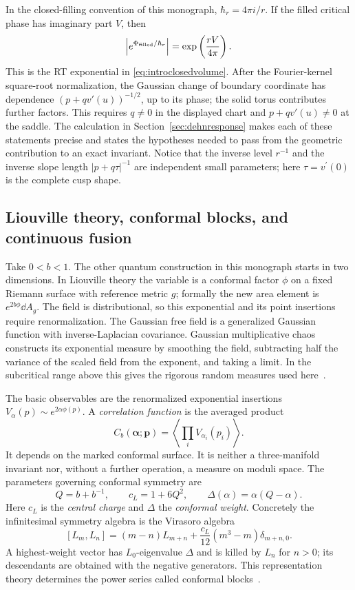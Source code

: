 In the closed-filling convention of this monograph,
$\hbar_r=4\pi i/r$. If the filled critical phase has imaginary
part $V$, then
\begin{equation}
 \left|e^{\Phi_{\rm filled}/\hbar_r}\right|
       =\exp\left(\frac{rV}{4\pi}\right).
 \label{eq:introRTgrowth}
\end{equation}
This is the RT exponential in \eqref{eq:introclosedvolume}.
After the Fourier-kernel square-root normalization, the Gaussian
change of boundary coordinate has dependence
$(p+qv'(u))^{-1/2}$, up to its phase; the solid torus contributes
further factors. This requires $q\ne0$ in the displayed chart and
$p+qv'(u)\ne0$ at the saddle.
The calculation in Section~\ref{sec:dehnresponse} makes each of
these statements precise and states the hypotheses needed to pass
from the geometric contribution to an exact invariant. Notice that
the inverse level $r^{-1}$ and the inverse slope length
$|p+q\tau|^{-1}$ are independent small parameters; here
$\tau=v^\prime(0)$ is the complete cusp shape.

\subsection{Liouville theory, conformal blocks, and continuous fusion}
\label{sec:introLiouville}

Take $0<b<1$. The other quantum construction in this monograph starts in two
dimensions. In Liouville theory the variable is a conformal factor
$\phi$ on a fixed Riemann surface with reference metric $g$;
formally the new area element is $e^{2b\phi}\dd A_g$.
The field is distributional, so this exponential and its point
insertions require renormalization. The Gaussian free field is a
generalized Gaussian function with inverse-Laplacian covariance.
Gaussian multiplicative chaos constructs its exponential measure
by smoothing the field, subtracting half the variance of the
scaled field from the exponent, and taking a limit. In the subcritical range above this
gives the rigorous random measures used here~\cite{KRV}.

The basic observables are the renormalized exponential insertions
$V_\alpha(p)\sim e^{2\alpha\phi(p)}$. A \emph{correlation function}
is the averaged product
\[
 C_b(\boldsymbol\alpha;\boldsymbol p)
       =\left\langle\prod_i V_{\alpha_i}(p_i)\right\rangle.
\]
It depends on the marked conformal surface. It is neither a
three-manifold invariant nor, without a further operation, a
measure on moduli space. The parameters governing conformal
symmetry are
\begin{equation}
 Q=b+b^{-1},\qquad c_L=1+6Q^2,\qquad
 \Delta(\alpha)=\alpha(Q-\alpha).
 \label{eq:introLiouvilleparameters}
\end{equation}
Here $c_L$ is the \emph{central charge} and $\Delta$ the
\emph{conformal weight}. Concretely the infinitesimal symmetry
algebra is the Virasoro algebra
\[
 [L_m,L_n]=(m-n)L_{m+n}
       +\frac{c_L}{12}(m^3-m)\delta_{m+n,0}.
\]
A highest-weight vector has $L_0$-eigenvalue $\Delta$ and is killed
by $L_n$ for $n>0$; its descendants are obtained with the negative
generators. This representation theory determines the power
series called conformal blocks~\cite{TeschnerRevisited}.

